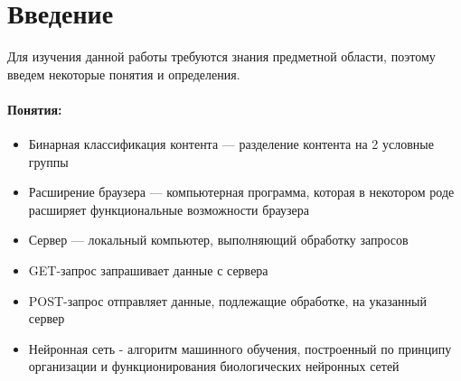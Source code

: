 \documentclass[14pt]{matmex-diploma}
\begin{document}
\maketitle
\tableofcontents

\section*{Введение} 

    Для изучения данной работы требуются знания предметной области, поэтому введем некоторые понятия и определения.
    
    \paragraph{Понятия:}
        \begin{itemize}
            \item Бинарная классификация контента — разделение контента на 2 условные группы
            \item Расширение браузера — компьютерная программа, которая в некотором роде расширяет функциональные возможности браузера
            \item Сервер — локальный компьютер, выполняющий обработку запросов 
            \item GET-запрос запрашивает данные с сервера
            \item POST-запрос  отправляет данные, подлежащие обработке, на указанный сервер
            \item Нейронная сеть - алгоритм машинного обучения, построенный по принципу организации и функционирования биологических нейронных сетей \cite{wiki:nn}
        \end{itemize}
        
\end{document}
